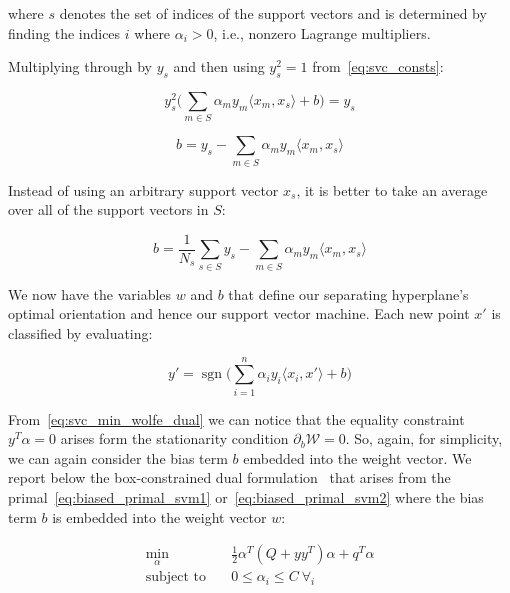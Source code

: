 where $s$ denotes the set of indices of the support vectors and is determined by finding the indices $i$ where $\alpha_i>0$, i.e., nonzero Lagrange multipliers.

Multiplying through by $y_s$ and then using $y_s^2=1$ from~\eqref{eq:svc_consts}:

\begin{equation} \label{eq:svc_sv_squared_const2}
	y_s^2\big(\sum_{m\in S}\alpha_m y_m \langle x_m, x_s \rangle +b\big)=y_s
\end{equation}

\begin{equation} \label{eq:svc_b}
	b=y_s-\sum_{m\in S}\alpha_m y_m \langle x_m, x_s \rangle
\end{equation}

Instead of using an arbitrary support vector $x_s$, it is better to take an average over all of the support vectors in $S$:

\begin{equation} \label{eq:svc_b_avg}
	b=\frac{1}{N_s}\sum_{s\in S} y_s-\sum_{m\in S}\alpha_m y_m \langle x_m, x_s \rangle
\end{equation}

We now have the variables $w$ and $b$ that define our separating hyperplane's optimal orientation and hence our support vector machine. Each new point $x'$ is classified by evaluating:

\begin{equation} \label{eq:svc_pred}
    y'=\operatorname{sgn}\big(\sum_{i=1}^n\alpha_i y_i\langle x_i, x' \rangle+b\big)
\end{equation}

From~\eqref{eq:svc_min_wolfe_dual} we can notice that the equality constraint $y^T \alpha = 0$ arises form the stationarity condition $\partial_{{b}} \mathcal{W}=0$. So, again, for simplicity, we can again consider the bias term $b$ embedded into the weight vector. We report below the box-constrained dual formulation~\cite{hsu2002simple} that arises from the primal~\eqref{eq:biased_primal_svm1} or~\eqref{eq:biased_primal_svm2} where the bias term $b$ is embedded into the weight vector $w$:

\begin{equation} \label{eq:svc_min_bcqp_wolf_dual}
    \begin{aligned}
        \min_{\alpha} \quad & \frac{1}{2} \alpha^T (Q + yy^T)\alpha+q^T\alpha \\
            \text{subject to} \quad & 0\leq\alpha_i\leq C \ \forall_i
    \end{aligned}
\end{equation}


